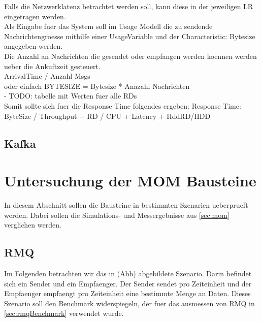 Falls die Netzwerklatenz betrachtet werden soll, kann diese in der jeweiligen LR eingetragen werden.\\

Als Eingabe fuer das System soll im Usage Modell die zu sendende Nachrichtengroesse mithilfe einer UsageVariable und der Characteristic: Bytesize angegeben werden.\\

Die Anzahl an Nachrichten die gesendet oder empfangen werden koennen werden ueber die Ankuftzeit gesteuert.\\
ArrivalTime / Anzahl Msgs \\
oder einfach BYTESIZE = Bytesize * Anazahl Nachrichten \\

- TODO: tabelle mit Werten fuer alle RDs\\

Somit sollte sich fuer die Response Time folgendes ergeben: Response Time: ByteSize / Throughput + RD / CPU + Latency + HddRD/HDD \\








\subsection{Kafka}

\section{Untersuchung der MOM Bausteine}
In diesem Abschnitt sollen die Bausteine in bestimmten Szenarien ueberprueft werden. Dabei sollen die Simulations- und Messergebnisse aus \autoref{sec:mom} verglichen werden.
\subsection{RMQ}
Im Folgenden betrachten wir das in (Abb) abgebildete Szenario. Darin befindet sich ein Sender und ein Empfaenger. Der Sender sendet pro Zeiteinheit und der Empfaenger empfaengt pro Zeiteinheit eine bestimmte Menge an Daten. Dieses Szenario soll den Benchmark widerspiegeln, der fuer das ausmessen von RMQ in \autoref{sec:rmqBenchmark} verwendet wurde.




